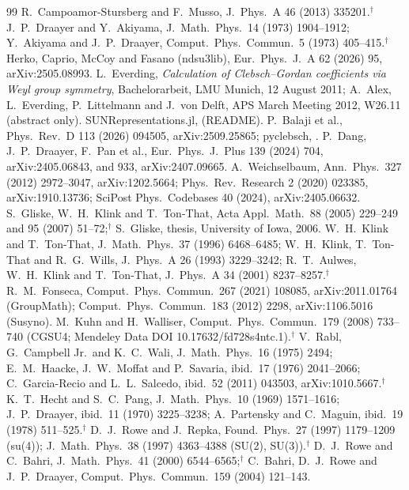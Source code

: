 \documentclass[11pt]{article}
\begin{document}
{\begin{thebibliography}{99}
 R.~Campoamor-Stursberg and F.~Musso, J.~Phys.\ A 46 (2013) 335201.$^\dagger$
 J.~P.~Draayer and Y.~Akiyama, J.~Math.\ Phys.\ 14 (1973) 1904--1912; Y.~Akiyama and J.~P.~Draayer, Comput.\ Phys.\ Commun.\ 5 (1973) 405--415.$^\dagger$
 Herko, Caprio, McCoy and Fasano (ndsu3lib), Eur.\ Phys.\ J.\ A 62 (2026) 95, arXiv:2505.08993.
 L.~Everding, \emph{Calculation of Clebsch--Gordan coefficients via Weyl group symmetry}, Bachelorarbeit, LMU Munich, 12 August 2011; A.~Alex, L.~Everding, P.~Littelmann and J.~von Delft, APS March Meeting 2012, W26.11 (abstract only).
 SUNRepresentations.jl,  (README).
 P.~Balaji et al., Phys.\ Rev.\ D 113 (2026) 094505, arXiv:2509.25865; pyclebsch, .
 P.~Dang, J.~P.~Draayer, F.~Pan et al., Eur.\ Phys.\ J.\ Plus 139 (2024) 704, arXiv:2405.06843, and 933, arXiv:2407.09665.
 A.~Weichselbaum, Ann.\ Phys.\ 327 (2012) 2972--3047, arXiv:1202.5664; Phys.\ Rev.\ Research 2 (2020) 023385, arXiv:1910.13736; SciPost Phys.\ Codebases 40 (2024), arXiv:2405.06632.
 S.~Gliske, W.~H.~Klink and T.~Ton-That, Acta Appl.\ Math.\ 88 (2005) 229--249 and 95 (2007) 51--72;$^\dagger$ S.~Gliske, thesis, University of Iowa, 2006.
 W.~H.~Klink and T.~Ton-That, J.~Math.\ Phys.\ 37 (1996) 6468--6485; W.~H.~Klink, T.~Ton-That and R.~G.~Wills, J.~Phys.\ A 26 (1993) 3229--3242; R.~T.~Aulwes, W.~H.~Klink and T.~Ton-That, J.~Phys.\ A 34 (2001) 8237--8257.$^\dagger$
 R.~M.~Fonseca, Comput.\ Phys.\ Commun.\ 267 (2021) 108085, arXiv:2011.01764 (GroupMath); Comput.\ Phys.\ Commun.\ 183 (2012) 2298, arXiv:1106.5016 (Susyno).
 M.~Kuhn and H.~Walliser, Comput.\ Phys.\ Commun.\ 179 (2008) 733--740 (CGSU4; Mendeley Data DOI 10.17632/fd728s4ntc.1).$^\dagger$
 V.~Rabl, G.~Campbell Jr.\ and K.~C.~Wali, J.~Math.\ Phys.\ 16 (1975) 2494; E.~M.~Haacke, J.~W.~Moffat and P.~Savaria, ibid.\ 17 (1976) 2041--2066; C.~Garcia-Recio and L.~L.~Salcedo, ibid.\ 52 (2011) 043503, arXiv:1010.5667.$^\dagger$
 K.~T.~Hecht and S.~C.~Pang, J.~Math.\ Phys.\ 10 (1969) 1571--1616; J.~P.~Draayer, ibid.\ 11 (1970) 3225--3238; A.~Partensky and C.~Maguin, ibid.\ 19 (1978) 511--525.$^\dagger$
 D.~J.~Rowe and J.~Repka, Found.\ Phys.\ 27 (1997) 1179--1209 (su(4)); J.~Math.\ Phys.\ 38 (1997) 4363--4388 (SU(2), SU(3)).$^\dagger$
 D.~J.~Rowe and C.~Bahri, J.~Math.\ Phys.\ 41 (2000) 6544--6565;$^\dagger$ C.~Bahri, D.~J.~Rowe and J.~P.~Draayer, Comput.\ Phys.\ Commun.\ 159 (2004) 121--143.

\end{thebibliography}}
\end{document}

